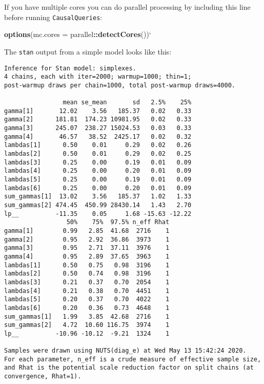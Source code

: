 \documentclass[
  12pt,
]{book}
\newenvironment{Shaded}{\begin{snugshade}}{\end{snugshade}}
\newcommand{\DataTypeTok}[1]{\textcolor[rgb]{0.13,0.29,0.53}{#1}}
\newcommand{\KeywordTok}[1]{\textcolor[rgb]{0.13,0.29,0.53}{\textbf{#1}}}
\newcommand{\NormalTok}[1]{#1}
\newcommand{\OperatorTok}[1]{\textcolor[rgb]{0.81,0.36,0.00}{\textbf{#1}}}
\newcommand{\StringTok}[1]{\textcolor[rgb]{0.31,0.60,0.02}{#1}}
\begin{document}
If you have multiple cores you can do parallel processing by including this line before running \texttt{CausalQueries}:

\begin{Shaded}
\begin{Highlighting}[]
\KeywordTok{options}\NormalTok{(}\DataTypeTok{mc.cores =}\NormalTok{ parallel}\OperatorTok{::}\KeywordTok{detectCores}\NormalTok{())}\StringTok{`}
\end{Highlighting}
\end{Shaded}

The \texttt{stan} output from a simple model looks like this:

\begin{verbatim}
Inference for Stan model: simplexes.
4 chains, each with iter=2000; warmup=1000; thin=1; 
post-warmup draws per chain=1000, total post-warmup draws=4000.

                mean se_mean       sd   2.5%    25%
gamma[1]       12.02    3.56   185.37   0.02   0.33
gamma[2]      181.81  174.23 10981.95   0.02   0.33
gamma[3]      245.07  238.27 15024.53   0.03   0.33
gamma[4]       46.57   38.52  2425.17   0.02   0.32
lambdas[1]      0.50    0.01     0.29   0.02   0.26
lambdas[2]      0.50    0.01     0.29   0.02   0.25
lambdas[3]      0.25    0.00     0.19   0.01   0.09
lambdas[4]      0.25    0.00     0.20   0.01   0.09
lambdas[5]      0.25    0.00     0.19   0.01   0.09
lambdas[6]      0.25    0.00     0.20   0.01   0.09
sum_gammas[1]  13.02    3.56   185.37   1.02   1.33
sum_gammas[2] 474.45  450.99 28430.14   1.43   2.70
lp__          -11.35    0.05     1.68 -15.63 -12.22
                 50%    75%  97.5% n_eff Rhat
gamma[1]        0.99   2.85  41.68  2716    1
gamma[2]        0.95   2.92  36.86  3973    1
gamma[3]        0.95   2.71  37.11  3976    1
gamma[4]        0.95   2.89  37.65  3963    1
lambdas[1]      0.50   0.75   0.98  3196    1
lambdas[2]      0.50   0.74   0.98  3196    1
lambdas[3]      0.21   0.37   0.70  2054    1
lambdas[4]      0.21   0.38   0.70  4451    1
lambdas[5]      0.20   0.37   0.70  4022    1
lambdas[6]      0.20   0.36   0.73  4648    1
sum_gammas[1]   1.99   3.85  42.68  2716    1
sum_gammas[2]   4.72  10.60 116.75  3974    1
lp__          -10.96 -10.12  -9.21  1324    1

Samples were drawn using NUTS(diag_e) at Wed May 13 15:42:24 2020.
For each parameter, n_eff is a crude measure of effective sample size,
and Rhat is the potential scale reduction factor on split chains (at 
convergence, Rhat=1).
\end{verbatim}
\end{document}
